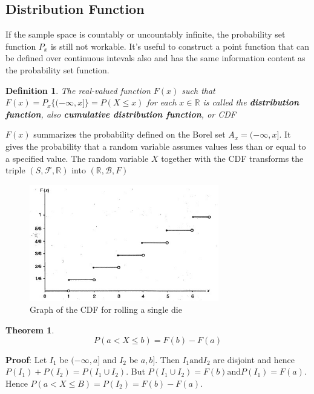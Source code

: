 \documentclass{article}
\newtheorem{definition}{Definition}[section]
\newtheorem{theorem}{Theorem}[section]
\begin{document}
\subsection{Distribution Function}

If the sample space is countably or uncountably infinite, the probability set function \(P_x\) is still not workable. It's useful to construct a point function that can be defined over continuous intevals also and has the same information content as the probability set function.

\begin{definition}
    The real-valued function \(F(x)\) such that \(F(x)=P_x \{ (- \infty, x ]\} = P(X \leq x)\) for each \(x \in \mathbb{R}\) is called the \textbf{distribution function}, also \textbf{cumulative distribution function}, or CDF
\end{definition}

\(F(x)\) summarizes the probability defined on the Borel set \(A_x=(- \infty, x]\). It gives the probability that a random variable assumes values less than or equal to a specified value. The random variable \(X\) together with the CDF transforms the triple \((S, \mathcal{F}, \mathbb{R})\) into \((\mathbb{R}, \mathcal{B}, F)\)

\begin{figure} [H]
    \centering
    \includegraphics[height=2in]{pics/cdf.jpg}
    \caption{Graph of the CDF for rolling a single die}
    \label{cdf}
\end{figure}

\begin{theorem}
    \begin{equation*}
        P(a < X \leq b) = F (b) - F (a)
    \end{equation*}
\end{theorem}

\textbf{Proof}: Let \(I_1\) be \( (-\infty,a]\) and \(I_2\) be \(a,b]\). Then \(I_1 \text{and} I_2\) are disjoint and hence \(P(I_1)+P(I_2)=P(I_1 \cup I_2)\). But \(P(I_1 \cup I_2) = F(b) \text{and} P(I_1)=F(a)\). Hence \(P(a < X \leq B) = P(I_2) = F(b) - F(a)\).
\end{document}
